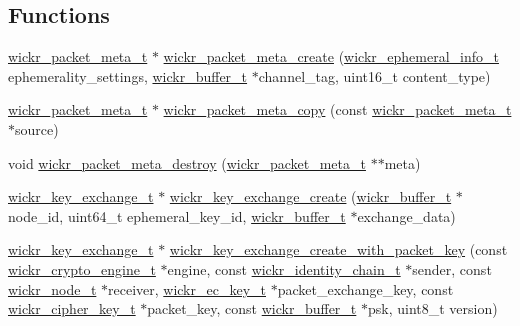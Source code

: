 \subsection*{Functions}
\begin{DoxyCompactItemize}
\item 
\mbox{\hyperlink{structwickr__packet__meta}{wickr\+\_\+packet\+\_\+meta\+\_\+t}} $\ast$ \mbox{\hyperlink{group__wickr__protocol_ga146144d74da12c1fff766462fe7fa661}{wickr\+\_\+packet\+\_\+meta\+\_\+create}} (\mbox{\hyperlink{structwickr__ephemeral__info}{wickr\+\_\+ephemeral\+\_\+info\+\_\+t}} ephemerality\+\_\+settings, \mbox{\hyperlink{structwickr__buffer}{wickr\+\_\+buffer\+\_\+t}} $\ast$channel\+\_\+tag, uint16\+\_\+t content\+\_\+type)
\item 
\mbox{\hyperlink{structwickr__packet__meta}{wickr\+\_\+packet\+\_\+meta\+\_\+t}} $\ast$ \mbox{\hyperlink{group__wickr__protocol_ga1bb5a0f2a49069679b174b3e6521fe9b}{wickr\+\_\+packet\+\_\+meta\+\_\+copy}} (const \mbox{\hyperlink{structwickr__packet__meta}{wickr\+\_\+packet\+\_\+meta\+\_\+t}} $\ast$source)
\item 
void \mbox{\hyperlink{group__wickr__protocol_gad165ad670da761478cf5f8f91223c1d3}{wickr\+\_\+packet\+\_\+meta\+\_\+destroy}} (\mbox{\hyperlink{structwickr__packet__meta}{wickr\+\_\+packet\+\_\+meta\+\_\+t}} $\ast$$\ast$meta)
\item 
\mbox{\hyperlink{structwickr__key__exchange}{wickr\+\_\+key\+\_\+exchange\+\_\+t}} $\ast$ \mbox{\hyperlink{group__wickr__protocol_gac2823b3430070b0db9ef1f40d3a804ea}{wickr\+\_\+key\+\_\+exchange\+\_\+create}} (\mbox{\hyperlink{structwickr__buffer}{wickr\+\_\+buffer\+\_\+t}} $\ast$node\+\_\+id, uint64\+\_\+t ephemeral\+\_\+key\+\_\+id, \mbox{\hyperlink{structwickr__buffer}{wickr\+\_\+buffer\+\_\+t}} $\ast$exchange\+\_\+data)
\item 
\mbox{\hyperlink{structwickr__key__exchange}{wickr\+\_\+key\+\_\+exchange\+\_\+t}} $\ast$ \mbox{\hyperlink{group__wickr__protocol_gac21e7b7fda1612923d83e7e75166209c}{wickr\+\_\+key\+\_\+exchange\+\_\+create\+\_\+with\+\_\+packet\+\_\+key}} (const \mbox{\hyperlink{structwickr__crypto__engine}{wickr\+\_\+crypto\+\_\+engine\+\_\+t}} $\ast$engine, const \mbox{\hyperlink{structwickr__identity__chain}{wickr\+\_\+identity\+\_\+chain\+\_\+t}} $\ast$sender, const \mbox{\hyperlink{structwickr__node}{wickr\+\_\+node\+\_\+t}} $\ast$receiver, \mbox{\hyperlink{structwickr__ec__key}{wickr\+\_\+ec\+\_\+key\+\_\+t}} $\ast$packet\+\_\+exchange\+\_\+key, const \mbox{\hyperlink{structwickr__cipher__key}{wickr\+\_\+cipher\+\_\+key\+\_\+t}} $\ast$packet\+\_\+key, const \mbox{\hyperlink{structwickr__buffer}{wickr\+\_\+buffer\+\_\+t}} $\ast$psk, uint8\+\_\+t version)
$$
\end{DoxyCompactItemize}

